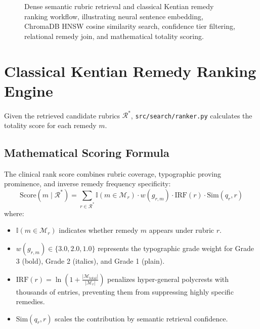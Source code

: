 \begin{sloppypar}
\begin{figure}[htp]
{\begin{tikzpicture}
\end{tikzpicture}
}
\caption{Dense semantic rubric retrieval and classical Kentian remedy ranking workflow, illustrating neural sentence embedding, ChromaDB HNSW cosine similarity search, confidence tier filtering, relational remedy join, and mathematical totality scoring.}
\label{fig:ml_pipeline}
\end{figure}

\section{Classical Kentian Remedy Ranking Engine}
Given the retrieved candidate rubrics $\mathcal{R}^*$, \texttt{src/search/ranker.py} calculates the totality score for each remedy $m$.

\subsection{Mathematical Scoring Formula}
The clinical rank score combines rubric coverage, typographic proving prominence, and inverse remedy frequency specificity:
\begin{equation}
    \text{Score}(m \mid \mathcal{R}^*) = \sum_{r \in \mathcal{R}^*} \mathbb{I}(m \in \mathcal{M}_r) \cdot w(g_{r,m}) \cdot \text{IRF}(r) \cdot \text{Sim}(q_r, r)
\end{equation}
where:
\begin{itemize}
    \item $\mathbb{I}(m \in \mathcal{M}_r)$ indicates whether remedy $m$ appears under rubric $r$.
    \item $w(g_{r,m}) \in \{3.0, 2.0, 1.0\}$ represents the typographic grade weight for Grade 3 (bold), Grade 2 (italics), and Grade 1 (plain).
    \item $\text{IRF}(r) = \ln\left(1 + \frac{|\mathcal{M}_{\text{total}}|}{|\mathcal{M}_r|}\right)$ penalizes hyper-general polycrests with thousands of entries, preventing them from suppressing highly specific remedies.
    \item $\text{Sim}(q_r, r)$ scales the contribution by semantic retrieval confidence.
\end{itemize}

\end{sloppypar}